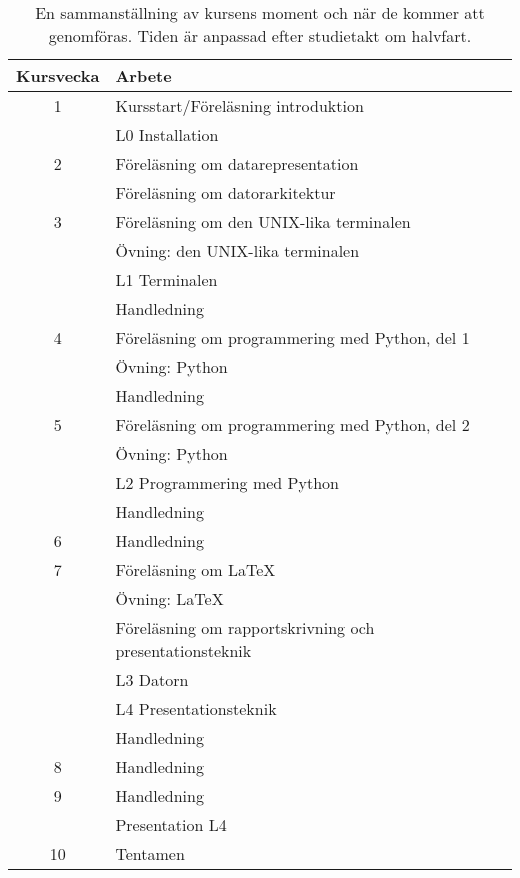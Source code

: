 \documentclass[a4paper,logo]{miunart}
\begin{document}
\begin{table}
  \centering
  \begin{tabular}{cp{9cm}}
    \toprule
    \textbf{Kursvecka}	& \textbf{Arbete} \\
    \midrule
    1
    & Kursstart/Föreläsning introduktion \\
    & L0 Installation \\
    \midrule
    2
    & Föreläsning om datarepresentation \\
    & Föreläsning om datorarkitektur \\
    \midrule
    3
    & Föreläsning om den UNIX-lika terminalen \\
    & Övning: den UNIX-lika terminalen \\
    & L1 Terminalen \\
    & Handledning \\
    \midrule
    4
    & Föreläsning om programmering med Python, del 1 \\
    & Övning: Python \\
    & Handledning \\
    \midrule
    5
    & Föreläsning om programmering med Python, del 2 \\
    & Övning: Python \\
    & L2 Programmering med Python \\
    & Handledning \\
    \midrule
    6
    & Handledning \\
    \midrule
    7
    & Föreläsning om LaTeX \\
    & Övning: LaTeX \\
    & Föreläsning om rapportskrivning och presentationsteknik \\
    & L3 Datorn \\
    & L4 Presentationsteknik \\
    & Handledning \\
    \midrule
    8
    & Handledning \\
    \midrule
    9
    & Handledning \\
    & Presentation L4 \\
    \midrule
    10
    & Tentamen \\
    \bottomrule
  \end{tabular}
  \caption{En sammanställning av kursens moment och när de kommer att 
    genomföras.
  Tiden är anpassad efter studietakt om halvfart.}
  \label{tbl:schema}
\end{table}
\end{document}
